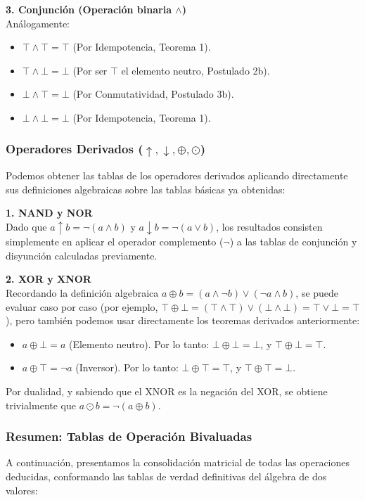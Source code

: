 \documentclass[12pt,a4paper]{article}
\begin{document}
\textbf{3. Conjunción (Operación binaria $\wedge$)} \\
Análogamente:
\begin{itemize}
    \item $\top \wedge \top = \top$ (Por Idempotencia, Teorema 1).
    \item $\top \wedge \bot = \bot$ (Por ser $\top$ el elemento neutro, Postulado 2b).
    \item $\bot \wedge \top = \bot$ (Por Conmutatividad, Postulado 3b).
    \item $\bot \wedge \bot = \bot$ (Por Idempotencia, Teorema 1).
\end{itemize}

\subsubsection{Operadores Derivados ($\uparrow, \downarrow, \oplus, \odot$)}
Podemos obtener las tablas de los operadores derivados aplicando directamente sus definiciones algebraicas sobre las tablas básicas ya obtenidas:

\textbf{1. NAND y NOR} \\
Dado que $a \uparrow b = \neg(a \wedge b)$ y $a \downarrow b = \neg(a \vee b)$, los resultados consisten simplemente en aplicar el operador complemento ($\neg$) a las tablas de conjunción y disyunción calculadas previamente.

\textbf{2. XOR y XNOR} \\
Recordando la definición algebraica $a \oplus b = (a \wedge \neg b) \vee (\neg a \wedge b)$, se puede evaluar caso por caso (por ejemplo, $\top \oplus \bot = (\top \wedge \top) \vee (\bot \wedge \bot) = \top \vee \bot = \top$), pero también podemos usar directamente los teoremas derivados anteriormente:
\begin{itemize}
    \item $a \oplus \bot = a$ (Elemento neutro). Por lo tanto: $\bot \oplus \bot = \bot$, y $\top \oplus \bot = \top$.
    \item $a \oplus \top = \neg a$ (Inversor). Por lo tanto: $\bot \oplus \top = \top$, y $\top \oplus \top = \bot$.
\end{itemize}
Por dualidad, y sabiendo que el XNOR es la negación del XOR, se obtiene trivialmente que $a \odot b = \neg(a \oplus b)$.

\subsubsection{Resumen: Tablas de Operación Bivaluadas}
A continuación, presentamos la consolidación matricial de todas las operaciones deducidas, conformando las tablas de verdad definitivas del álgebra de dos valores:
\end{document}
